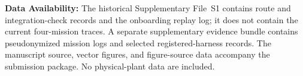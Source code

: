 \noindent\textbf{Data Availability:} The historical Supplementary File~S1
contains route and integration-check records and the onboarding replay log;
it does not contain the current four-mission traces. A separate supplementary
evidence bundle contains pseudonymized mission logs and selected
registered-harness records. The manuscript source, vector figures, and
figure-source data accompany the submission package. No physical-plant data
are included.
